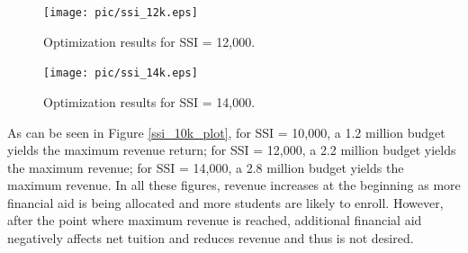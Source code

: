 \documentclass[12pt,english]{report}
\begin{document}
\begin{figure}[ht]
    \centering
    \texttt{[image: pic/ssi\_12k.eps]}
    \caption{Optimization results for SSI = 12,000. }
     \label{ssi_12k_plot}
\end{figure}

\begin{figure}[ht]
    \centering
    \texttt{[image: pic/ssi\_14k.eps]}
    \caption{Optimization results for SSI = 14,000. }
     \label{ssi_14k_plot}
\end{figure}


As can be seen in Figure \ref{ssi_10k_plot}, for SSI = 10,000, a 1.2 million budget yields the maximum  revenue return; for SSI  = 12,000, a 2.2 million budget yields the maximum revenue; for SSI  = 14,000, a  2.8 million budget yields the maximum revenue.  In all these figures, revenue increases at the beginning  as more financial aid is being allocated and more students are likely to enroll. However, after the point  where maximum revenue is reached, additional financial aid negatively affects net tuition and reduces  revenue and thus is not desired.  

\end{document}
